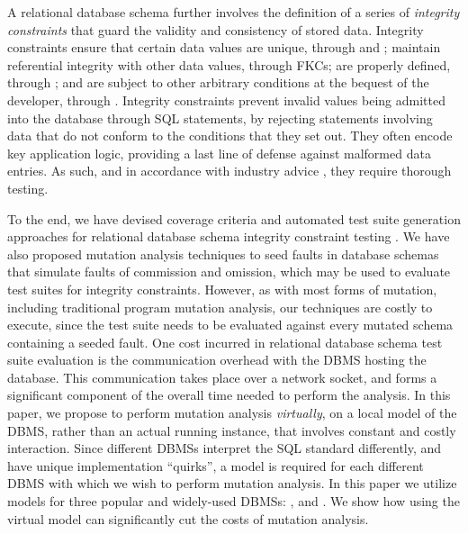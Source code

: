 %
 
\begin{sloppypar}
A relational database schema further involves the definition of a series of {\it integrity constraints} that guard the validity and consistency of stored data. Integrity constraints ensure that certain data values are unique, through \PKCs and \UCs; maintain referential integrity with other data values, through FKCs; are properly defined, through \NNCs; and are subject to other arbitrary conditions at the bequest of the developer, through \CCs. Integrity constraints prevent invalid values being admitted into the database through SQL \INSERT statements, by rejecting statements involving data that do not conform to the conditions that they set out. They often encode key application logic, providing a last line of defense against malformed data entries. As such, and in accordance with industry advice \cite{DzoneDatabaseTesting}, they require thorough testing. 
\end{sloppypar}

To the end, we have devised coverage criteria and automated test suite generation approaches for relational database schema integrity constraint testing \cite{Kapfhammer2013,McMinn2015}. We have also proposed mutation analysis techniques to seed faults in database schemas that simulate faults of commission and omission, which may be used to evaluate test suites for integrity constraints. 
%
However, as with most forms of mutation, including traditional program mutation analysis, our techniques are costly to execute, since the test suite needs to be evaluated against every mutated schema containing a seeded fault. 
%
One cost incurred in relational database schema test suite evaluation is the communication overhead with the DBMS hosting the database. This communication takes place over a network socket, and forms a significant component of the overall time needed to perform the analysis. In this paper, we propose to perform mutation analysis {\it virtually}, on a local model of the DBMS, rather than an actual running instance, that involves constant and costly interaction. Since different DBMSs interpret the SQL standard differently, and have unique implementation ``quirks'', a model is required for each different DBMS with which we wish to perform mutation analysis. In this paper we utilize models for three popular and widely-used DBMSs: \HyperSQL, \Postgres and \SQLite. %
We show how using the virtual model can significantly cut the costs of mutation analysis. %

